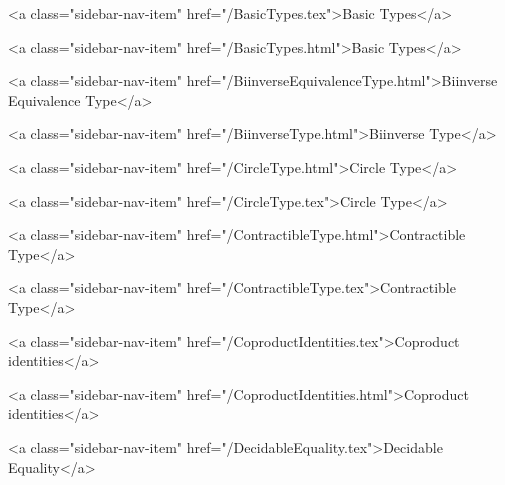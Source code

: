           <a class="sidebar-nav-item" href="/BasicTypes.tex">Basic Types</a>
        
      
    
      
        
          <a class="sidebar-nav-item" href="/BasicTypes.html">Basic Types</a>
        
      
    
      
        
          <a class="sidebar-nav-item" href="/BiinverseEquivalenceType.html">Biinverse Equivalence Type</a>
        
      
    
      
        
          <a class="sidebar-nav-item" href="/BiinverseType.html">Biinverse Type</a>
        
      
    
      
        
          <a class="sidebar-nav-item" href="/CircleType.html">Circle Type</a>
        
      
    
      
        
          <a class="sidebar-nav-item" href="/CircleType.tex">Circle Type</a>
        
      
    
      
        
          <a class="sidebar-nav-item" href="/ContractibleType.html">Contractible Type</a>
        
      
    
      
        
          <a class="sidebar-nav-item" href="/ContractibleType.tex">Contractible Type</a>
        
      
    
      
        
          <a class="sidebar-nav-item" href="/CoproductIdentities.tex">Coproduct identities</a>
        
      
    
      
        
          <a class="sidebar-nav-item" href="/CoproductIdentities.html">Coproduct identities</a>
        
      
    
      
        
          <a class="sidebar-nav-item" href="/DecidableEquality.tex">Decidable Equality</a>
        
      
    
